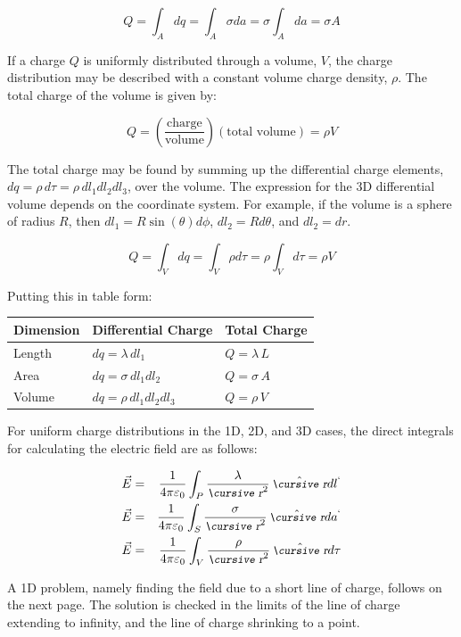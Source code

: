 \documentclass[12pt]{article}
\begin{document}
\begin{flushleft}
\[
Q = \int_{A} dq = \int_{A} \sigma da = \sigma \int_{A}  da = \sigma A
\]

If a charge $Q$ is uniformly distributed through a volume, $V$, the charge distribution may be described with a constant volume charge density, $\rho$.  The total charge of the volume is given by:

\[
Q = \left( \frac{ \mbox{charge} }{ \mbox{volume} } \right) \left( \mbox{total volume} \right) = \rho V
\]

The total charge may be found by summing up the differential charge elements, $dq=\rho \, d\tau = \rho \, dl_{1}dl_{2}dl_{3}$, over the volume.  The expression for the 3D differential volume depends on the coordinate system.  For example, if the volume is a sphere of radius $R$, then $dl_{1}=R\sin{(\theta)}d\phi$, $dl_{2}=Rd\theta$, and $dl_{2}=dr$.

\[
Q = \int_{V} dq = \int_{V} \rho d\tau = \rho \int_{V}  d\tau = \rho V
\]

Putting this in table form:

\begin{center}  
\begin{tabular}{|l|l|l|}\hline
Dimension & Differential Charge & Total Charge \\
\hline\hline
Length  &   $dq=\lambda \, dl_{1}$ & $Q=\lambda \, L$ \\
Area  &  $dq=\sigma \, dl_{1}dl_{2}$ & $Q=\sigma \, A$ \\
Volume & $dq=\rho \, dl_{1}dl_{2}dl_{3}$ & $Q=\rho \, V$\\
\hline
\end{tabular}
\end{center}

For uniform charge distributions in the 1D, 2D, and 3D cases, the direct integrals for calculating the electric field are as follows:

\begin{eqnarray*}
\vec{E} & =& \frac{1}{4\pi \varepsilon_{0}} \int_{P} \frac{\lambda}{\text{\small\slshape\cursive r}^{2}} \, \hat{\text{\small\slshape\cursive r}} dl^{`} \\
\vec{E} & =& \frac{1}{4\pi \varepsilon_{0}} \int_{S} \frac{\sigma}{\text{\small\slshape\cursive r}^{2}} \, \hat{\text{\small\slshape\cursive r}} da^{`} \\
\vec{E} & =& \frac{1}{4\pi \varepsilon_{0}} \int_{V} \frac{\rho}{\text{\small\slshape\cursive r}^{2}} \, \hat{\text{\small\slshape\cursive r}} d\tau 
\end{eqnarray*}

A 1D problem, namely finding the field due to a short line of charge, follows on the next page.  The solution is checked in the limits of the line of charge extending to infinity, and the line of charge shrinking to a point.


\end{flushleft}
\end{document}
